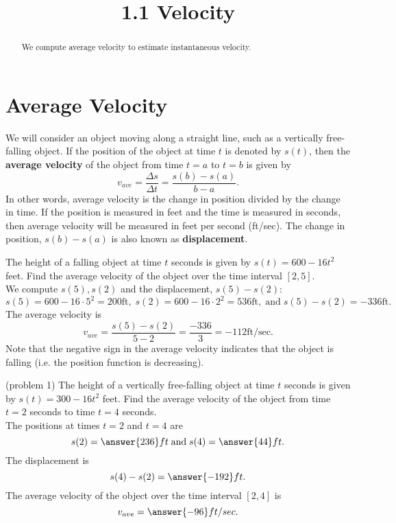 \documentclass[handout]{ximera}
\title{1.1 Velocity}
\begin{document}
\begin{abstract}
We compute average velocity to estimate instantaneous velocity.
\end{abstract}

\maketitle

\section{Average Velocity}
We will consider an object moving along a straight line, such as a vertically free-falling object. If the position of the object at time $t$
is denoted by $s(t)$, then the \textbf{average velocity} of the object from time $t = a$ to $t = b$ is given by 
\[
v_{ave} = \frac{\Delta s}{\Delta t} = \frac{s(b) - s(a)}{b-a}.
\]
In other words, average velocity is the change in position divided by the change in time. 
If the position is measured in feet and the time is measured in seconds, then average velocity will be 
measured in feet per second (ft/sec). The change in position, $s(b) - s(a)$ is also known as \textbf{displacement}.


\begin{example}[example 1]
The height of a falling object at time $t$ seconds is given by $s(t) = 600-16t^2$ feet.
Find the average velocity of the object over the time interval $[2, 5]$.\\
We compute $s(5), s(2)$ and the displacement, $s(5) - s(2)$:
\[
s(5) = 600 - 16\cdot 5^2 = 200 \text{ft}, \; s(2) = 600 - 16 \cdot 2^2 = 536 \text{ft}, \; \text {and} \; s(5) - s(2) = -336 \text{ft}.
\]
The average velocity is
\[
v_{ave} = \frac{s(5) - s(2)}{5-2} = \frac{-336}{3} = - 112 \text{ft/sec}.
\]
Note that the negative sign in the average velocity indicates that the object is falling (i.e. the position function is decreasing).
\end{example}



\begin{problem}(problem 1)
The height of a vertically free-falling object at time $t$ seconds is given by $s(t) = 300 - 16t^2$ feet.
Find the average velocity of the object from time $t = 2$ seconds to time $t = 4$ seconds.\\
The positions at times $t = 2$ and $t= 4$ are
\[
s(2) = \answer{236}ft \; \text{and} \; s(4) = \answer{44}ft.
\]
The displacement is 
\[
s(4) - s(2) = \answer{-192}ft.
\]
The average velocity of the object over the time interval $[2,4]$ is 
\[
v_{ave} = \answer{-96}ft/sec.
\]

\end{problem}
\end{document}
